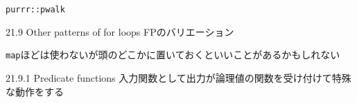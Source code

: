 \documentclass[
  ignorenonframetext,
  aspectratio=169]{beamer}
\newenvironment{Shaded}{\begin{snugshade}}{\end{snugshade}}
\newcommand{\AttributeTok}[1]{\textcolor[rgb]{0.77,0.63,0.00}{#1}}
\newcommand{\FunctionTok}[1]{\textcolor[rgb]{0.00,0.00,0.00}{#1}}
\newcommand{\NormalTok}[1]{#1}
\newcommand{\OtherTok}[1]{\textcolor[rgb]{0.56,0.35,0.01}{#1}}
\newcommand{\SpecialCharTok}[1]{\textcolor[rgb]{0.00,0.00,0.00}{#1}}
\newcommand{\StringTok}[1]{\textcolor[rgb]{0.31,0.60,0.02}{#1}}
\begin{document}
\begin{frame}[fragile]{\texttt{purrr::pwalk}}
\protect\hypertarget{purrrpwalk}{}
\begin{Shaded}
\end{Shaded}
\end{frame}

\begin{frame}[fragile]{21.9 Other patterns of for loops}
\protect\hypertarget{other-patterns-of-for-loops}{}
FPのバリエーション

\texttt{map}ほどは使わないが頭のどこかに置いておくといいことがあるかもしれない
\end{frame}

\begin{frame}{21.9.1 Predicate functions}
\protect\hypertarget{predicate-functions}{}
入力関数として出力が論理値の関数を受け付けて特殊な動作をする
\end{frame}
\end{document}
